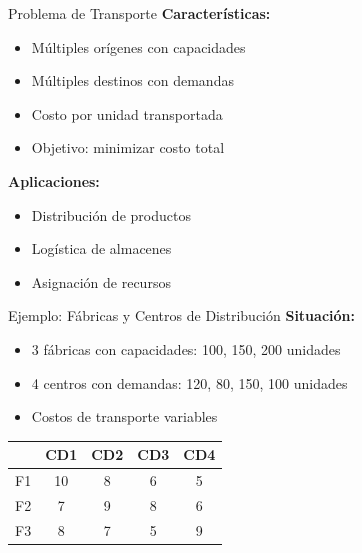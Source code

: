 \documentclass{beamer}
\begin{document}
\begin{frame}{Problema de Transporte}
    \textbf{Características:}
    \begin{itemize}
        \item Múltiples orígenes con capacidades
        \item Múltiples destinos con demandas
        \item Costo por unidad transportada
        \item Objetivo: minimizar costo total
    \end{itemize}
    
    \vspace{1em}
    \textbf{Aplicaciones:}
    \begin{itemize}
        \item Distribución de productos
        \item Logística de almacenes
        \item Asignación de recursos
    \end{itemize}
\end{frame}

\begin{frame}{Ejemplo: Fábricas y Centros de Distribución}
    \textbf{Situación:}
    \begin{itemize}
        \item 3 fábricas con capacidades: 100, 150, 200 unidades
        \item 4 centros con demandas: 120, 80, 150, 100 unidades
        \item Costos de transporte variables
    \end{itemize}
    
    \vspace{1em}
    \begin{table}[H]
        \centering
        \tiny
        \begin{tabular}{c|cccc}
            \toprule
            & CD1 & CD2 & CD3 & CD4 \\
            \midrule
            F1 & 10 & 8 & 6 & 5 \\
            F2 & 7 & 9 & 8 & 6 \\
            F3 & 8 & 7 & 5 & 9 \\
            \bottomrule
        \end{tabular}
    \end{table}
\end{frame}
\end{document}
